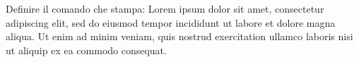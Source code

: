 Definire il comando \Lorem che stampa:
Lorem ipsum dolor sit amet, consectetur adipiscing elit, 
sed do eiusmod tempor incididunt ut labore et dolore magna 
aliqua. Ut enim ad minim veniam, quis nostrud exercitation 
ullamco laboris nisi ut aliquip ex ea commodo consequat. 